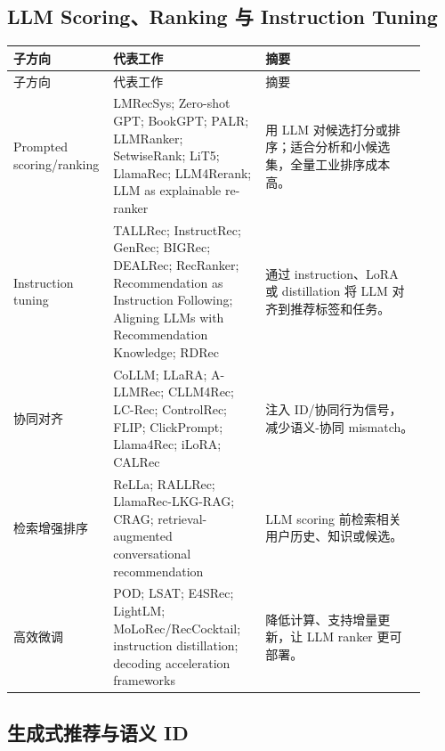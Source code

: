 \documentclass[UTF8,fontset=fandol,11pt]{ctexart}
\begin{document}
\subsection{LLM Scoring、Ranking 与 Instruction Tuning}

\small
\begin{longtable}{@{}p{0.18\linewidth}p{0.36\linewidth}p{0.38\linewidth}@{}}
\toprule
子方向 & 代表工作 & 摘要\\
\midrule
\endfirsthead
\toprule
子方向 & 代表工作 & 摘要\\
\midrule
\endhead
Prompted scoring/ranking & LMRecSys; Zero-shot GPT; BookGPT; PALR; LLMRanker; SetwiseRank; LiT5; LlamaRec; LLM4Rerank; LLM as explainable re-ranker & 用 LLM 对候选打分或排序；适合分析和小候选集，全量工业排序成本高。\\
Instruction tuning & TALLRec; InstructRec; GenRec; BIGRec; DEALRec; RecRanker; Recommendation as Instruction Following; Aligning LLMs with Recommendation Knowledge; RDRec & 通过 instruction、LoRA 或 distillation 将 LLM 对齐到推荐标签和任务。\\
协同对齐 & CoLLM; LLaRA; A-LLMRec; CLLM4Rec; LC-Rec; ControlRec; FLIP; ClickPrompt; Llama4Rec; iLoRA; CALRec & 注入 ID/协同行为信号，减少语义-协同 mismatch。\\
检索增强排序 & ReLLa; RALLRec; LlamaRec-LKG-RAG; CRAG; retrieval-augmented conversational recommendation & LLM scoring 前检索相关用户历史、知识或候选。\\
高效微调 & POD; LSAT; E4SRec; LightLM; MoLoRec/RecCocktail; instruction distillation; decoding acceleration frameworks & 降低计算、支持增量更新，让 LLM ranker 更可部署。\\
\bottomrule
\end{longtable}
\normalsize

\subsection{生成式推荐与语义 ID}
\end{document}
